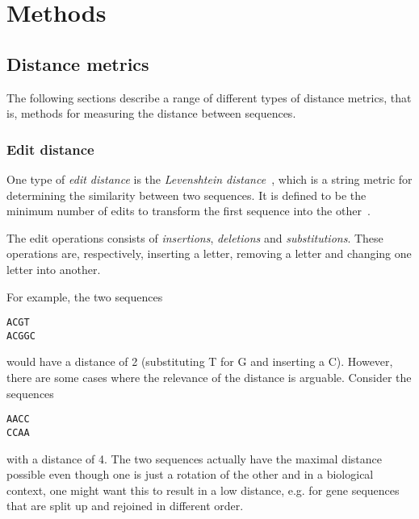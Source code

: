 \section{Methods}

\subsection{Distance metrics}

The following sections describe a range of different types of distance metrics,
that is, methods for measuring the distance between sequences.

\subsubsection{Edit distance}

One type of \emph{edit distance} is the \emph{Levenshtein
distance}~\cite{levenshtein}, which is a string metric for determining the
similarity between two sequences. It is defined to be the minimum number of
edits to transform the first sequence into the other~\cite[p.~52]{dong}.

The edit operations consists of \emph{insertions}, \emph{deletions} and
\emph{substitutions}. These operations are, respectively, inserting a letter,
removing a letter and changing one letter into another.

For example, the two sequences
\begin{center}
  \texttt{ACGT} \\
  \texttt{ACGGC}
\end{center}
would have a distance of 2 (substituting T for G and inserting a C). However,
there are some cases where the relevance of the distance is arguable. Consider
the sequences
\begin{center}
  \texttt{AACC} \\
  \texttt{CCAA}
\end{center}
with a distance of 4. The two sequences actually have the maximal distance
possible even though one is just a rotation of the other and in a biological
context, one might want this to result in a low distance, e.g. for gene
sequences that are split up and rejoined in different order.


